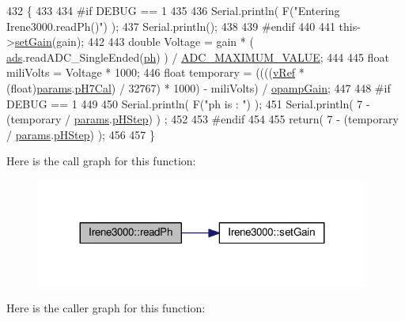 \begin{DoxyCode}
432 \{
433 
434 \textcolor{preprocessor}{#if DEBUG == 1 }
435 
436     Serial.println( F(\textcolor{stringliteral}{"Entering Irene3000.readPh()"}) );
437     Serial.println();
438 
439 \textcolor{preprocessor}{#endif }
440 
441     this->\hyperlink{classIrene3000_aff7c5da186b388e7272e63ff88a20c34}{setGain}(gain);
442 
443     \textcolor{keywordtype}{double} Voltage =  gain * ( \hyperlink{classIrene3000_a1215e77ba761c9908d80d691f149e135}{ads}.readADC\_SingleEnded(\hyperlink{Irene3000_8h_af771ceafe0e6524dd8497d4305dfe778}{ph}) ) / 
      \hyperlink{Irene3000_8h_ae04444a85a37b5dce09107f2ce2b2c80}{ADC\_MAXIMUM\_VALUE};
444 
445     \textcolor{keywordtype}{float} miliVolts = Voltage * 1000;
446     \textcolor{keywordtype}{float} temporary = ((((\hyperlink{classIrene3000_a018e7ff9bee57e6d2b298667a668ba7e}{vRef} * (float)\hyperlink{classIrene3000_a136585a5ee7f9ac6ab52175fa153f8e3}{params}.\hyperlink{structIrene3000_1_1parameters__T_a21265466a570d84bff914f26d2f7a03e}{pH7Cal}) / 32767) * 1000) - miliVolts) / 
      \hyperlink{classIrene3000_a4e588985ca74e5076029d5dee81034f2}{opampGain};
447 
448 \textcolor{preprocessor}{#if DEBUG == 1 }
449 
450     Serial.println( F(\textcolor{stringliteral}{"ph is : "}) );
451     Serial.println( 7 - (temporary / \hyperlink{classIrene3000_a136585a5ee7f9ac6ab52175fa153f8e3}{params}.\hyperlink{structIrene3000_1_1parameters__T_a61cfcc2539d5f630e9071f3753aba9fe}{pHStep}) ) ;
452 
453 \textcolor{preprocessor}{#endif }
454 
455     \textcolor{keywordflow}{return}( 7 - (temporary / \hyperlink{classIrene3000_a136585a5ee7f9ac6ab52175fa153f8e3}{params}.\hyperlink{structIrene3000_1_1parameters__T_a61cfcc2539d5f630e9071f3753aba9fe}{pHStep}) );
456 
457 \}
\end{DoxyCode}
Here is the call graph for this function\+:\nopagebreak
\begin{figure}[H]
\begin{center}
\leavevmode
\includegraphics[width=311pt]{classIrene3000_abf3db725fabb0634ec889b32068a5eec_cgraph}
\end{center}
\end{figure}
Here is the caller graph for this function\+:\nopagebreak
